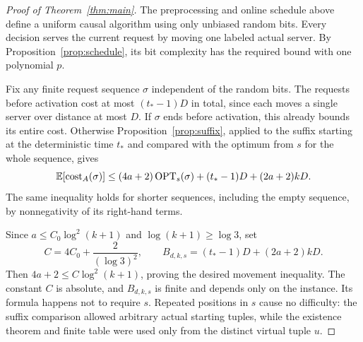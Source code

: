 

\begin{proof}[Proof of Theorem~\ref{thm:main}]
The preprocessing and online schedule above define a uniform causal
algorithm using only unbiased random bits.  Every decision serves the
current request by moving one labeled actual server.  By
Proposition~\ref{prop:schedule}, its bit complexity has the required bound
with one polynomial $p$.

Fix any finite request sequence $\sigma$ independent of the random bits.
The requests before activation cost at most
$(t_*-1)D$ in total, since each moves a single server over distance at most
$D$.  If $\sigma$ ends before activation, this already bounds its entire
cost.  Otherwise Proposition~\ref{prop:suffix}, applied to the suffix
starting at the deterministic time $t_*$ and compared with the optimum
from $s$ for the whole sequence, gives
\begin{equation}
 \mathbb E[\operatorname{cost}_A(\sigma)]
 \le (4a+2)\operatorname{OPT}_s(\sigma)
       +(t_*-1)D+(2a+2)kD.
 \label{eq:full-movement-bound}
\end{equation}
The same inequality holds for shorter sequences, including the empty
sequence, by nonnegativity of its right-hand terms.

Since $a\le C_0\log^2(k+1)$ and $\log(k+1)\ge\log3$, set
\begin{equation}
 C=4C_0+\frac{2}{(\log3)^2},
 \qquad
 B_{d,k,s}=(t_*-1)D+(2a+2)kD.
 \label{eq:final-constants}
\end{equation}
Then $4a+2\le C\log^2(k+1)$, proving the desired movement inequality.
The constant $C$ is absolute, and $B_{d,k,s}$ is finite and depends only
on the instance.  Its formula happens not to require $s$.  Repeated
positions in $s$ cause no difficulty: the suffix comparison allowed
arbitrary actual starting tuples, while the existence theorem and finite
table were used only from the distinct virtual tuple $u$.
\end{proof}
